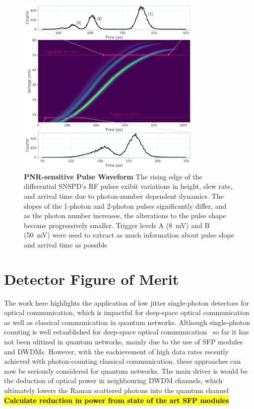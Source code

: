 \documentclass{optica-article}
\begin{document}
\hypertarget{fig:waveform}{%
\begin{figure}
\centering
\includegraphics[width=0.8\textwidth]{./figs_03/waveform_light.pdf}
\caption[{PNR-sensitive Pulse Waveform}]{\textbf{PNR-sensitive Pulse Waveform} The rising edge of the differential SNSPD's RF pulses exibit variations in height, slew rate, and arrival time due to photon-number dependent dynamics. The slopes of the 1-photon and 2-photon pulses significantly differ, and as the photon number increases, the alterations to the pulse shape become progressively smaller. Trigger levels A (8~mV) and B (50~mV) were used to extract as much information about pulse slope and arrival time as possible}
\label{fig:waveform}
\end{figure}
}

\hypertarget{detector-figure-of-merit}{%
\section{Detector Figure of Merit}\label{detector-figure-of-merit}}

The work here highlights the application of low jitter single-photon detectors for optical communication, which is impactful for deep-space optical communication as well as classical communication in quantum networks. Although single-photon counting is well estanblished for deep-space optical communication~\cite{Laser lunar, DSOC} so far it has not been ulitized in quantum networks, mainly due to the use of SFP modules and DWDMs. However, with the eachievement of high data rates recently achieved with photon-counting classical communication, these approaches can now be seriously considered for quantum networks. The main driver is would be the deduction of optical power in neighbouring DWDM channels, which ultimately lowers the Raman scattered photons into the quantum channel \cite{EraerdsRaman}
\textbf{\hl{Calculate reduction in power from state of the art SFP modules}}
\end{document}
